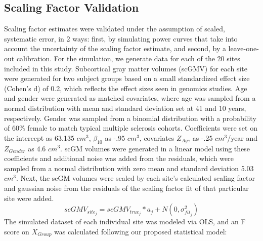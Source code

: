 \documentclass{article}
\begin{document}
\subsection{Scaling Factor Validation}
Scaling factor estimates were validated under the assumption of scaled, systematic error, in 2 ways: first, by simulating power curves that take into account the uncertainty of the scaling factor estimate, and second, by a leave-one-out calibration. For the simulation, we generate data for each of the 20 sites included in this study. Subcortical gray matter volumes (scGMV) for each site were generated for two subject groups based on a small standardized effect size (Cohen's d) of 0.2, which reflects the effect sizes seen in genomics studies. Age and gender were generated as matched covariates, where age was sampled from a normal distribution with mean and standard deviation set at 41 and 10 years, respectively. Gender was sampled from a binomial distribution with a probability of 60\% female to match typical multiple sclerosis cohorts. %
Coefficients were set on the intercept as 63.135 $cm^3$, $\beta_{10}$ as -.95 $cm^3$, covariates $Z_{Age}$ as -.25 $cm^3$/year and $Z_{Gender}$ as 4.6 $cm^3$. scGM volumes were generated in a linear model using these coefficients and additional noise was added from the  residuals, which were sampled from a normal distribution with zero mean and standard deviation 5.03 $cm^3$. Next, the scGM volumes were scaled by each site's calculated scaling factor and gaussian noise from the residuals of the scaling factor fit of that particular site were added.
\begin{equation}
scGMV_{site_j} = scGMV_{true_j}*a_j + N(0,\sigma_{fit_j}^2)
\end{equation}
The simulated dataset of each individual site was modeled via OLS, and an F score on $X_{Group}$ was calculated following our proposed statistical model:
\end{document}
